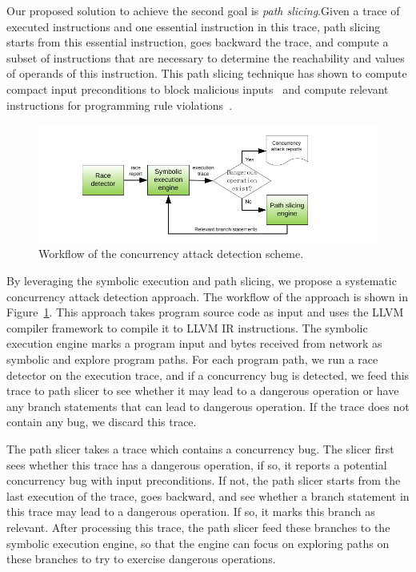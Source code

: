 Our proposed solution to achieve the second goal is \emph{path slicing}.Given a 
trace of executed instructions and one essential instruction in this trace, 
path slicing starts from this essential instruction, goes backward the trace, 
and compute a subset of instructions that are necessary to determine the 
reachability and values of operands of this instruction. This path slicing 
technique has shown to compute compact input preconditions to block malicious 
inputs~\cite{castro:bouncer} and compute relevant instructions for programming 
rule violations~\cite{woodpecker:asplos13}.

\begin{figure}[ht]
\centering
\includegraphics[width=0.5\columnwidth]{figures/detection}
\vspace{-.05in}
\caption{{Workflow of the concurrency attack detection scheme.}} 
\label{fig:detection}
\vspace{-.05in}
\end{figure}

By leveraging the symbolic execution and path slicing, we propose a systematic 
concurrency attack detection approach. The workflow of the approach is shown in 
Figure~\ref{fig:detection}. This approach takes program source code as input 
and uses the LLVM compiler framework to compile it to LLVM IR instructions. The 
symbolic execution engine marks a program input and bytes received from network 
as symbolic and explore program paths. For each program path, we run a race 
detector on the execution trace, and if a concurrency bug is detected, we feed 
this trace to path slicer to see whether it may lead to a dangerous operation 
or have any branch statements that can lead to dangerous operation. If the 
trace does not contain any bug, we discard this trace.

The path slicer takes a trace which contains a concurrency bug. The slicer 
first sees whether this trace has a dangerous operation, if so, it reports a 
potential concurrency bug with input preconditions. If not, the path slicer 
starts from the last execution of the trace, goes backward, and see whether a 
branch statement in this trace may lead to a dangerous operation. If so, it 
marks this branch as relevant. After processing this trace, the path slicer 
feed these branches to the symbolic execution engine, so that the engine can 
focus on exploring paths on these branches to try to exercise dangerous 
operations.


